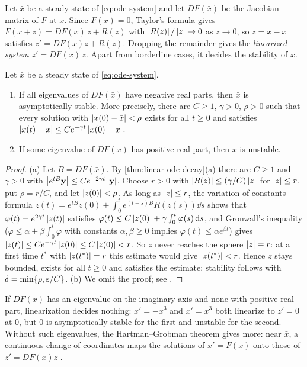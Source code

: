 Let $\bar x$ be a steady state of \eqref{eq:ode-system} and let $DF(\bar x)$ be the
Jacobian matrix of $F$ at $\bar x$. Since $F(\bar x)=0$, Taylor's formula gives
$F(\bar x+z) = DF(\bar x)\,z + R(z)$ with $\left\lvert R(z)\right\rvert/\left\lvert z\right\rvert\to0$ as $z\to0$, so
$z=x-\bar x$ satisfies $z'=DF(\bar x)z+R(z)$. Dropping the remainder gives the
\emph{linearized system} $z'=DF(\bar x)\,z$. Apart from borderline cases, it
decides the stability of $\bar x$.

\begin{theorem}\label{thm:linearized-stability}
Let $\bar x$ be a steady state of \eqref{eq:ode-system}.
\begin{enumerate}[label=(\alph*)]
  \item If all eigenvalues of $DF(\bar x)$ have negative real parts, then $\bar x$
        is asymptotically stable. More precisely, there are $C\ge1$, $\gamma>0$,
        $\rho>0$ such that every solution with $\left\lvert x(0)-\bar x\right\rvert<\rho$ exists for
        all $t\ge0$ and satisfies $\left\lvert x(t)-\bar x\right\rvert\le Ce^{-\gamma t}\left\lvert x(0)-\bar x\right\rvert$.
  \item If some eigenvalue of $DF(\bar x)$ has positive real part, then $\bar x$
        is unstable.
\end{enumerate}
\end{theorem}

\begin{proof}
(a) Let $B=DF(\bar x)$. By \cref{thm:linear-ode-decay}(a) there are $C\ge1$ and
$\gamma>0$ with $\left\lvert e^{tB}\mathbf y\right\rvert\le Ce^{-2\gamma t}\left\lvert \mathbf y\right\rvert$. Choose
$r>0$ with $\left\lvert R(z)\right\rvert\le(\gamma/C)\left\lvert z\right\rvert$ for $\left\lvert z\right\rvert\le r$, put $\rho=r/C$, and
let $\left\lvert z(0)\right\rvert<\rho$. As long as $\left\lvert z\right\rvert\le r$, the variation of constants formula
$z(t) = e^{tB}z(0) + \int_0^t e^{(t-s)B}R(z(s))\dd s$ shows that
$\varphi(t)=e^{2\gamma t}\left\lvert z(t)\right\rvert$ satisfies $\varphi(t)\le C\left\lvert z(0)\right\rvert+\gamma\int_0^t\varphi(s)\,\mathrm{d} s$, and Gronwall's
inequality ($\varphi\le\alpha+\beta\int_0^t\varphi$ with constants
$\alpha,\beta\ge0$ implies $\varphi(t)\le\alpha e^{\beta t}$) gives
$\left\lvert z(t)\right\rvert\le Ce^{-\gamma t}\left\lvert z(0)\right\rvert\le C\left\lvert z(0)\right\rvert<r$. So $z$ never reaches
the sphere $\left\lvert z\right\rvert=r$: at a first time $t^*$ with $\left\lvert z(t^*)\right\rvert=r$ this estimate
would give $\left\lvert z(t^*)\right\rvert<r$. Hence $z$ stays bounded, exists for all $t\ge0$ and
satisfies the estimate; stability follows with $\delta=\min\{\rho,\varepsilon/C\}$.
(b) We omit the proof; see \cite{Teschl2012}.
\end{proof}

\begin{remark}\label{rem:ode-borderline}
If $DF(\bar x)$ has an eigenvalue on the imaginary axis and none with positive real
part, linearization decides nothing: $x'=-x^3$ and $x'=x^3$ both linearize to
$z'=0$ at $0$, but $0$ is asymptotically stable for the first and unstable for the
second. Without such eigenvalues, the Hartman--Grobman theorem gives more: near
$\bar x$, a continuous change of coordinates maps the solutions of $x'=F(x)$ onto
those of $z'=DF(\bar x)z$ \cite{Teschl2012}.
\end{remark}

